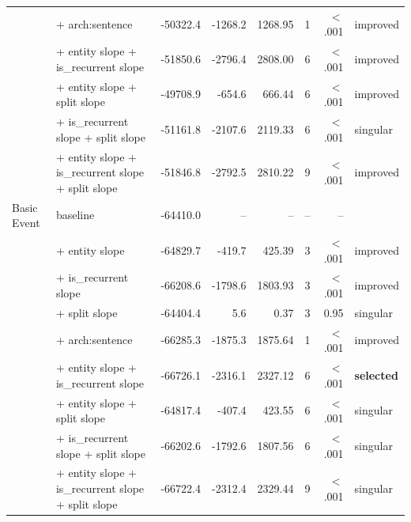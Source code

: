 \begin{longtable}{@{}llrrrrrl@{}}
 & + arch:sentence & -50322.4 & -1268.2 & 1268.95 & 1 & $<$.001 & improved \\
 & + entity slope + is\_recurrent slope & -51850.6 & -2796.4 & 2808.00 & 6 & $<$.001 & improved \\
 & + entity slope + split slope & -49708.9 & -654.6 & 666.44 & 6 & $<$.001 & improved \\
 & + is\_recurrent slope + split slope & -51161.8 & -2107.6 & 2119.33 & 6 & $<$.001 & singular \\
 & + entity slope + is\_recurrent slope + split slope & -51846.8 & -2792.5 & 2810.22 & 9 & $<$.001 & improved \\
\addlinespace
Basic Event & baseline & -64410.0 & -- & -- & -- & -- &  \\
 & + entity slope & -64829.7 & -419.7 & 425.39 & 3 & $<$.001 & improved \\
 & + is\_recurrent slope & -66208.6 & -1798.6 & 1803.93 & 3 & $<$.001 & improved \\
 & + split slope & -64404.4 & 5.6 & 0.37 & 3 & 0.95 & singular \\
 & + arch:sentence & -66285.3 & -1875.3 & 1875.64 & 1 & $<$.001 & improved \\
 & + entity slope + is\_recurrent slope & -66726.1 & -2316.1 & 2327.12 & 6 & $<$.001 & \textbf{selected} \\
 & + entity slope + split slope & -64817.4 & -407.4 & 423.55 & 6 & $<$.001 & singular \\
 & + is\_recurrent slope + split slope & -66202.6 & -1792.6 & 1807.56 & 6 & $<$.001 & singular \\
 & + entity slope + is\_recurrent slope + split slope & -66722.4 & -2312.4 & 2329.44 & 9 & $<$.001 & singular \\
\end{longtable}
\normalsize

